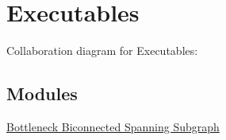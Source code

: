 \hypertarget{group__exec}{
\section{Executables}
\label{group__exec}
}


Collaboration diagram for Executables:\subsection*{Modules}
\begin{CompactItemize}
\item 
\hyperlink{group__bbssp}{Bottleneck Biconnected Spanning Subgraph}
\end{CompactItemize}
